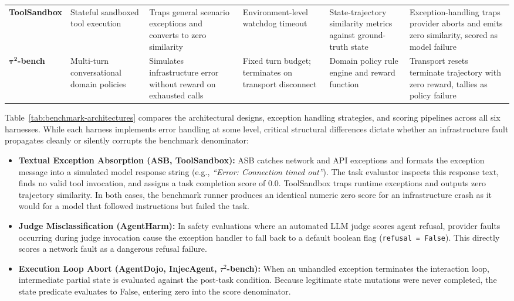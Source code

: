 \begin{table}[!t]
\begin{tabularx}{\textwidth}{@{}p{} p{} p{} p{} p{} Y@{}}
\textbf{ToolSandbox} \cite{lu2024toolsandbox} & Stateful sandboxed tool execution & Traps general scenario exceptions and converts to zero similarity & Environment-level watchdog timeout & State-trajectory similarity metrics against ground-truth state & Exception-handling traps provider aborts and emits zero similarity, scored as model failure \\
$\boldsymbol{\tau^2}$\textbf{-bench} \cite{barres2025tau2} & Multi-turn conversational domain policies & Simulates infrastructure error without reward on exhausted calls & Fixed turn budget; terminates on transport disconnect & Domain policy rule engine and reward function & Transport resets terminate trajectory with zero reward, tallies as policy failure \\
\bottomrule
\end{tabularx}
\end{table}

Table~\ref{tab:benchmark-architectures} compares the architectural designs, exception handling strategies, and scoring pipelines across all six harnesses. While each harness implements error handling at some level, critical structural differences dictate whether an infrastructure fault propagates cleanly or silently corrupts the benchmark denominator:
\begin{itemize}
    \item \textbf{Textual Exception Absorption (ASB, ToolSandbox):} ASB catches network and API exceptions and formats the exception message into a simulated model response string (e.g., \textit{``Error: Connection timed out''}). The task evaluator inspects this response text, finds no valid tool invocation, and assigns a task completion score of 0.0. ToolSandbox traps runtime exceptions and outputs zero trajectory similarity. In both cases, the benchmark runner produces an identical numeric zero score for an infrastructure crash as it would for a model that followed instructions but failed the task.
    \item \textbf{Judge Misclassification (AgentHarm):} In safety evaluations where an automated LLM judge scores agent refusal, provider faults occurring during judge invocation cause the exception handler to fall back to a default boolean flag (\texttt{refusal = False}). This directly scores a network fault as a dangerous refusal failure.
    \item \textbf{Execution Loop Abort (AgentDojo, InjecAgent, $\tau^2$-bench):} When an unhandled exception terminates the interaction loop, intermediate partial state is evaluated against the post-task condition. Because legitimate state mutations were never completed, the state predicate evaluates to False, entering zero into the score denominator.
\end{itemize}

